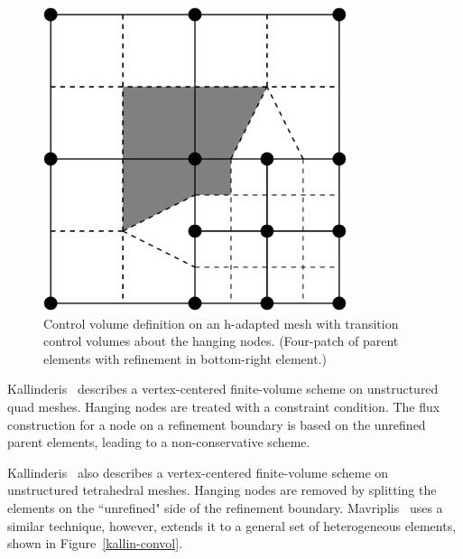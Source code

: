 \begin{figure}[h]
  \centerline{\includegraphics[width=3.5in]{images/hadapt2.pdf}}
  \vspace{0.25in}
  \caption{Control volume definition on an h-adapted mesh
           with transition control volumes about the
           hanging nodes. (Four-patch of parent elements 
           with refinement in bottom-right element.) }
  \label{aftosmis-convol}
\end{figure}

Kallinderis~\cite{Kallinderis:89} describes a vertex-centered
finite-volume scheme on unstructured quad meshes.  Hanging
nodes are treated with a constraint condition.  The flux
construction for a node on a refinement boundary is based
on the unrefined parent elements, leading to a 
non-conservative scheme.

Kallinderis~\cite{kallinderis:93} also describes a vertex-centered
finite-volume scheme on unstructured tetrahedral meshes.  Hanging
nodes are removed by splitting the elements on the ``unrefined"
side of the refinement boundary. Mavriplis~\cite{Mavriplis:00} uses a similar 
technique, however, extends it to a general set of heterogeneous elements,
shown in Figure~\ref{kallin-convol}.

